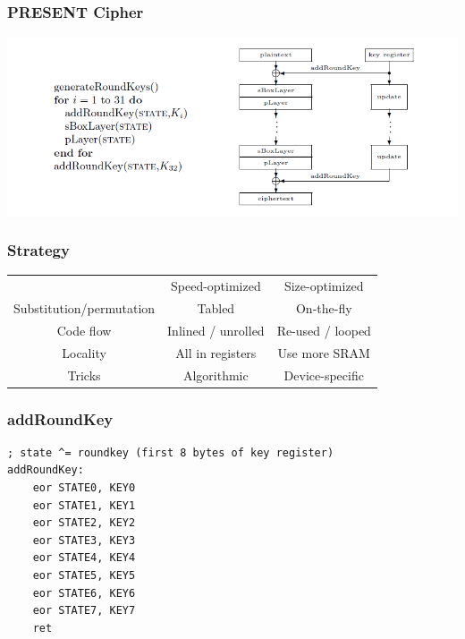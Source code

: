 \documentclass{beamer}
\begin{document}
\begin{frame}[fragile]
\frametitle{PRESENT Cipher}
\includegraphics[width=\textwidth]{cipher}
\end{frame}

\begin{frame}[fragile]
\frametitle{Strategy}
\begin{tabular}{c c c }
	& Speed-optimized & Size-optimized \\
Substitution/permutation & Tabled & On-the-fly \\
Code flow & Inlined / unrolled & Re-used / looped \\
Locality & All in registers & Use more SRAM \\
Tricks & Algorithmic & Device-specific \\

\end{tabular}
\end{frame}

\begin{frame}[fragile]
\frametitle{addRoundKey}
\begin{lstlisting}
; state ^= roundkey (first 8 bytes of key register)
addRoundKey:
    eor STATE0, KEY0
    eor STATE1, KEY1
    eor STATE2, KEY2
    eor STATE3, KEY3
    eor STATE4, KEY4
    eor STATE5, KEY5
    eor STATE6, KEY6
    eor STATE7, KEY7
    ret
\end{lstlisting}
\end{frame}
\end{document}
